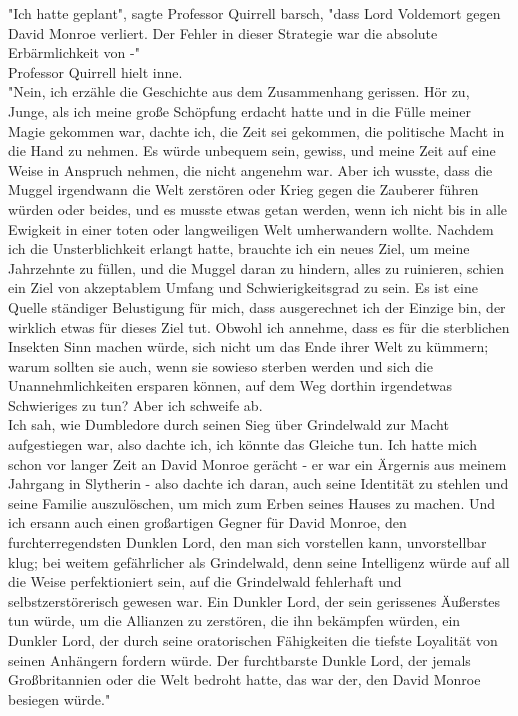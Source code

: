 {"Ich hatte geplant", sagte Professor Quirrell barsch, "dass Lord Voldemort gegen David Monroe verliert. Der Fehler in dieser Strategie war die absolute Erbärmlichkeit von -"\\ Professor Quirrell hielt inne.\\ "Nein, ich erzähle die Geschichte aus dem Zusammenhang gerissen. Hör zu, Junge, als ich meine große Schöpfung erdacht hatte und in die Fülle meiner Magie gekommen war, dachte ich, die Zeit sei gekommen, die politische Macht in die Hand zu nehmen. Es würde unbequem sein, gewiss, und meine Zeit auf eine Weise in Anspruch nehmen, die nicht angenehm war. Aber ich wusste, dass die Muggel irgendwann die Welt zerstören oder Krieg gegen die Zauberer führen würden oder beides, und es musste etwas getan werden, wenn ich nicht bis in alle Ewigkeit in einer toten oder langweiligen Welt umherwandern wollte. Nachdem ich die Unsterblichkeit erlangt hatte, brauchte ich ein neues Ziel, um meine Jahrzehnte zu füllen, und die Muggel daran zu hindern, alles zu ruinieren, schien ein Ziel von akzeptablem Umfang und Schwierigkeitsgrad zu sein. Es ist eine Quelle ständiger Belustigung für mich, dass ausgerechnet ich der Einzige bin, der wirklich etwas für dieses Ziel tut. Obwohl ich annehme, dass es für die sterblichen Insekten Sinn machen würde, sich nicht um das Ende ihrer Welt zu kümmern; warum sollten sie auch, wenn sie sowieso sterben werden und sich die Unannehmlichkeiten ersparen können, auf dem Weg dorthin irgendetwas Schwieriges zu tun? Aber ich schweife ab.\\ Ich sah, wie Dumbledore durch seinen Sieg über Grindelwald zur Macht aufgestiegen war, also dachte ich, ich könnte das Gleiche tun. Ich hatte mich schon vor langer Zeit an David Monroe gerächt - er war ein Ärgernis aus meinem Jahrgang in Slytherin - also dachte ich daran, auch seine Identität zu stehlen und seine Familie auszulöschen, um mich zum Erben seines Hauses zu machen. Und ich ersann auch einen großartigen Gegner für David Monroe, den furchterregendsten Dunklen Lord, den man sich vorstellen kann, unvorstellbar klug; bei weitem gefährlicher als Grindelwald, denn seine Intelligenz würde auf all die Weise perfektioniert sein, auf die Grindelwald fehlerhaft und selbstzerstörerisch gewesen war. Ein Dunkler Lord, der sein gerissenes Äußerstes tun würde, um die Allianzen zu zerstören, die ihn bekämpfen würden, ein Dunkler Lord, der durch seine oratorischen Fähigkeiten die tiefste Loyalität von seinen Anhängern fordern würde. Der furchtbarste Dunkle Lord, der jemals Großbritannien oder die Welt bedroht hatte, das war der, den David Monroe besiegen würde."

}
